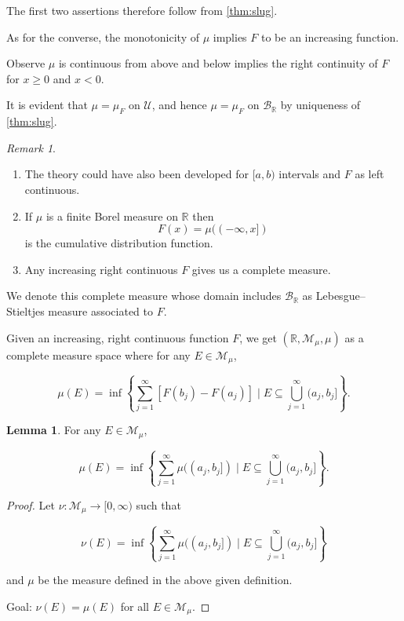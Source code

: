 \documentclass[11pt]{article}
\theoremstyle{definition}
\newtheorem{lemma}{Lemma}[section]
\theoremstyle{remark}
\newtheorem{remark}{Remark}[section]
\begin{document}
The first two assertions therefore follow from \cref{thm:slug}.

As for the converse, the monotonicity of $\mu$ implies $F$ to be an increasing function.

Observe $\mu$ is continuous from above and below implies the right continuity of $F$ for $x \geq 0$ and $x < 0$.

It is evident that $\mu = \mu_F$ on $\mathcal{U}$, and hence $\mu = \mu_F$ on $\mathcal{B}_{\mathbb{R}}$ by uniqueness of \cref{thm:slug}.

\begin{remark}\label{rem:theory_development}
    \begin{enumerate}
        \item The theory could have also been developed for $[a,b)$ intervals and $F$ as left continuous.
        \item If $\mu$ is a finite Borel measure on $\mathbb{R}$ then
        \[
        F(x) = \mu((-\infty, x])
        \]
        is the cumulative distribution function.
        \item Any increasing right continuous $F$ gives us a complete measure.
    \end{enumerate}
\end{remark}

We denote this complete measure whose domain includes $\mathcal{B}_{\mathbb{R}}$ as Lebesgue--Stieltjes measure associated to $F$.

Given an increasing, right continuous function $F$, we get $(\mathbb{R}, \mathcal{M}_\mu, \mu)$ as a complete measure space where for any $E \in \mathcal{M}_\mu$,

\[
\mu(E) = \inf \left\{ \sum_{j=1}^\infty [F(b_j) - F(a_j)] \mid E \subseteq \bigcup_{j=1}^\infty (a_j, b_j] \right\}.
\]

\begin{lemma}\label{lem:measure_equality}
For any $E \in \mathcal{M}_\mu$,

\[
\mu(E) = \inf \left\{ \sum_{j=1}^\infty \mu((a_j, b_j]) \mid E \subseteq \bigcup_{j=1}^\infty (a_j, b_j] \right\}.
\]

\begin{proof}
Let $\nu \colon \mathcal{M}_\mu \to [0, \infty)$ such that

\[
\nu(E) = \inf \left\{ \sum_{j=1}^\infty \mu((a_j, b_j]) \mid E \subseteq \bigcup_{j=1}^\infty (a_j, b_j] \right\}
\]

and $\mu$ be the measure defined in the above given definition.

Goal: $\nu(E) = \mu(E)$ for all $E \in \mathcal{M}_\mu$.
\end{proof}
\end{lemma}
\end{document}
